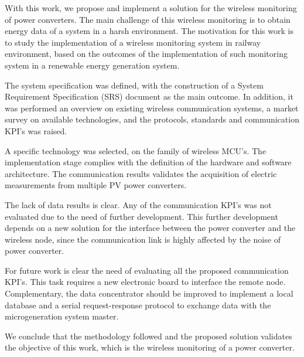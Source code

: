 
With this work, we propose and implement a solution for the wireless monitoring of power converters. The main challenge of this wireless monitoring is to obtain energy data of a system in a harsh environment. The motivation for this work is to study the implementation of a wireless monitoring system in railway environment, based on the outcomes of the implementation of such monitoring system in a renewable energy generation system.

The system specification was defined, with the construction of a System Requirement Specification (SRS) document as the main outcome. In addition, it was performed an overview on existing wireless communication systems, a market survey on available technologies, and the protocols, standards and communication KPI's was raised.

A specific technology was selected, on the family of wireless MCU's. The implementation stage complies with the definition of the hardware and software architecture. The communication results validates the acquisition of electric measurements from multiple PV power converters. 

The lack of data results is clear. Any of the communication KPI's was not evaluated due to the need of further development. This further development depends on a new solution for the interface between the power converter and the wireless node, since the communication link is highly affected by the noise of power converter.

For future work is clear the need of evaluating all the proposed communication KPI's. This task requires a new electronic board to interface the remote node. Complementary, the data concentrator should be improved to implement a local database and a serial request-response protocol to exchange data with the microgeneration system master.

We conclude that the methodology followed and the proposed solution validates the objective of this work, which is the wireless monitoring of a power converter.